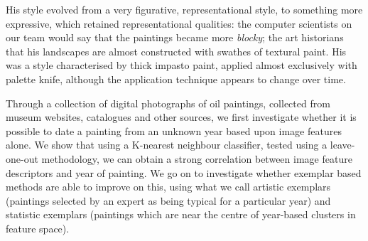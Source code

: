 \documentclass[conference,a4paper]{IEEEtran}
\begin{document}
His style evolved from a very figurative, representational style, to something more expressive, 
which retained representational qualities: the computer scientists on our team would say that the 
paintings became more \emph{blocky}; the art historians that his landscapes are almost 
constructed with swathes of textural paint. His was a style characterised by thick impasto paint,
applied almost exclusively with palette knife, although the application technique appears to 
change over time.

Through a collection of digital photographs of oil paintings, collected from museum websites, 
catalogues and other sources, we first investigate whether it is possible to date a painting from 
an unknown year based upon image features alone. We show that using a K-nearest neighbour 
classifier, tested using a leave-one-out methodology, we can obtain a strong correlation between 
image feature descriptors and year of painting. We go on to investigate whether exemplar based 
methods are able to improve on this, using what we call artistic exemplars (paintings selected by 
an expert as being typical for a particular year) and statistic exemplars (paintings which are 
near the centre of year-based clusters in feature space).

\end{document}
